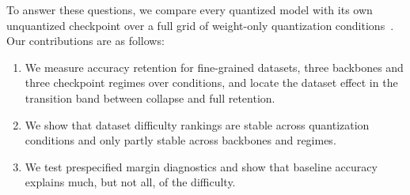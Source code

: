 To answer these questions, we compare every quantized model with its own unquantized checkpoint over a full grid of weight-only quantization conditions~\cite{badri2023hqq}.
Our contributions are as follows:
\begin{enumerate}
  \item We measure accuracy retention for  fine-grained datasets, three backbones and three checkpoint regimes over  conditions, and locate the dataset effect in the transition band between collapse and full retention.
  \item We show that dataset difficulty rankings are stable across quantization conditions and only partly stable across backbones and regimes.
  \item We test prespecified margin diagnostics and show that baseline accuracy explains much, but not all, of the difficulty.
\end{enumerate}
